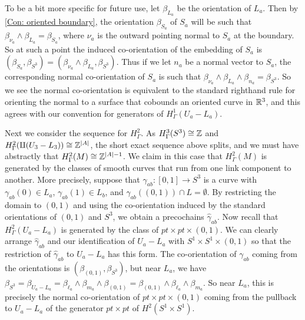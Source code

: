 \begin{example}
To be a bit more specific for future use, let $\beta_{L_a}$ be the orientation of $L_a$. Then by \cref{Con: oriented boundary}, the orientation $\beta_{S_a}$ of $S_a$ will be such that $\beta_{\nu_a} \wedge \beta_{L_a} = \beta_{S_a}$, where $\nu_a$ is the outward pointing normal to $S_a$ at the boundary.
So at such a point the induced co-orientation of the embedding of $S_a$ is $(\beta_{S_a},\beta_{S^3}) = (\beta_{\nu_a} \wedge \beta_{L_a},\beta_{S^3})$.
Thus if we let $n_a$ be a normal vector to $S_a$, the corresponding normal co-orientation of $S_a$ is such that $\beta_{\nu_a} \wedge \beta_{L_a} \wedge \beta_{n_a} = \beta_{S^3}$.
So we see the normal co-orientation is equivalent to the standard righthand rule for orienting the normal to a surface that cobounds an oriented curve in $\mathbb{R}^3$, and this agrees with our convention for generators of $H^1_\Gamma(U_a-L_a)$.

Next we consider the sequence for $H^2_\Gamma$.
As $H^3_\Gamma(S^3) \cong \mathbb{Z}$ and $H^2_\Gamma(\amalg(U_3-L_3)) \cong \mathbb{Z}^{|A|}$, the short exact sequence above splits, and we must have abstractly that $H^2_\Gamma(M) \cong \mathbb{Z}^{|A|-1}$.
We claim in this case that $H^2_\Gamma(M)$ is generated by the classes of smooth curves that run from one link component to another.
More precisely, suppose that $\gamma_{ab} \colon [0,1] \to S^3$ is a curve with $\gamma_{ab}(0) \in L_a$, $\gamma_{ab}(1) \in L_b$, and $\gamma_{ab}((0,1)) \cap L = \emptyset$.
By restricting the domain to $(0,1)$ and using the co-orientation induced by the standard orientations of $(0,1)$ and $S^3$, we obtain a precochains $\hat \gamma_{ab}$.
Now recall that $H^2_\Gamma(U_a-L_a)$ is generated by the class of $pt \times pt \times (0,1)$.
We can clearly arrange $\hat \gamma_{ab}$ and our identification of $U_a - L_a$ with $S^1 \times S^1 \times (0,1)$ so that the restriction of $\hat \gamma_{ab}$ to $U_a - L_a$ has this form.
The co-orientation of $\gamma_{ab}$ coming from the orientations is $(\beta_{(0,1)},\beta_{S^3})$, but near $L_a$, we have $\beta_{S^3} = \beta_{U_a - L_a} = \beta_{\ell_a} \wedge \beta_{m_a} \wedge \beta_{(0,1)} = \beta_{(0,1)} \wedge \beta_{\ell_a} \wedge \beta_{m_a}$.
So near $L_a$, this is precisely the normal co-orientation of $pt \times pt \times (0,1)$ coming from the pullback to $U_a - L_a$ of the generator $pt \times pt$ of $H^2(S^1 \times S^1)$.




\end{example}
